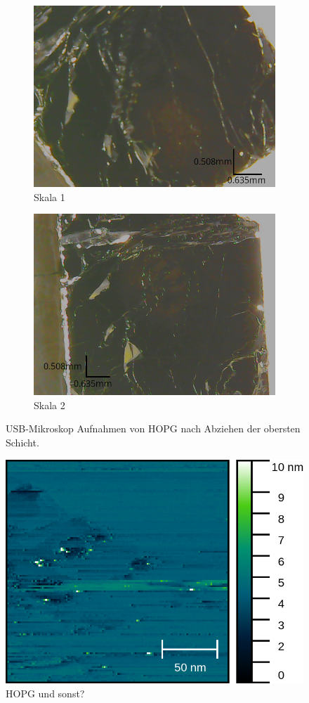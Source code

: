 \begin{figure}[htb]
    \centering
    \begin{subfigure}{0.45\linewidth}
        \centering
        \includegraphics[width=\linewidth]{figs/hopg_skala1.png}
        \caption{Skala 1}
        \label{fig:hopg_skala1}
    \end{subfigure}
    \hspace{0.5cm}
    \begin{subfigure}{0.45\linewidth}
        \centering
        \includegraphics[width=\linewidth]{figs/hopg_skala2.png}
        \caption{Skala 2}
        \label{fig:hopg_skala2}
    \end{subfigure}
    \caption{USB-Mikroskop Aufnahmen von HOPG nach Abziehen der obersten Schicht.}
    \label{fig:usb_mikroskop_hopg}
\end{figure}

\begin{figure}[htb]
    \centering
    \includegraphics[width=0.6\linewidth]{figs/HOPG10558.png}
    \caption{HOPG und sonst?}
    \label{fig:hopg_rtm_weitaufnahme}
\end{figure}